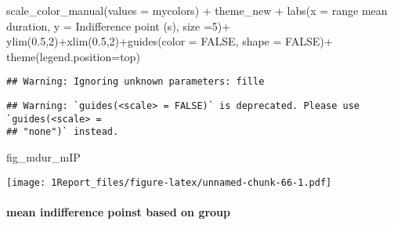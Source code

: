 \documentclass[
]{article}
\newenvironment{Shaded}{\begin{snugshade}}{\end{snugshade}}
\newcommand{\AttributeTok}[1]{\textcolor[rgb]{0.77,0.63,0.00}{#1}}
\newcommand{\ConstantTok}[1]{\textcolor[rgb]{0.00,0.00,0.00}{#1}}
\newcommand{\DecValTok}[1]{\textcolor[rgb]{0.00,0.00,0.81}{#1}}
\newcommand{\FloatTok}[1]{\textcolor[rgb]{0.00,0.00,0.81}{#1}}
\newcommand{\FunctionTok}[1]{\textcolor[rgb]{0.00,0.00,0.00}{#1}}
\newcommand{\NormalTok}[1]{#1}
\newcommand{\SpecialCharTok}[1]{\textcolor[rgb]{0.00,0.00,0.00}{#1}}
\newcommand{\StringTok}[1]{\textcolor[rgb]{0.31,0.60,0.02}{#1}}
\begin{document}
\begin{Shaded}
\begin{Highlighting}[]
  \FunctionTok{scale\_color\_manual}\NormalTok{(}\AttributeTok{values =}\NormalTok{ mycolors) }\SpecialCharTok{+}
\NormalTok{  theme\_new }\SpecialCharTok{+}
  \FunctionTok{labs}\NormalTok{(}\AttributeTok{x =} \StringTok{\textquotesingle{}range mean duration\textquotesingle{}}\NormalTok{, }\AttributeTok{y =} \StringTok{\textquotesingle{}Indifference point (s)\textquotesingle{}}\NormalTok{, }\AttributeTok{size =}\DecValTok{5}\NormalTok{)}\SpecialCharTok{+}
  \FunctionTok{ylim}\NormalTok{(}\FloatTok{0.5}\NormalTok{,}\DecValTok{2}\NormalTok{)}\SpecialCharTok{+}\FunctionTok{xlim}\NormalTok{(}\FloatTok{0.5}\NormalTok{,}\DecValTok{2}\NormalTok{)}\SpecialCharTok{+}\FunctionTok{guides}\NormalTok{(}\AttributeTok{color =} \ConstantTok{FALSE}\NormalTok{, }\AttributeTok{shape =} \ConstantTok{FALSE}\NormalTok{)}\SpecialCharTok{+}
   \FunctionTok{theme}\NormalTok{(}\AttributeTok{legend.position=}\StringTok{\textquotesingle{}top\textquotesingle{}}\NormalTok{)}
\end{Highlighting}
\end{Shaded}

\begin{verbatim}
## Warning: Ignoring unknown parameters: fille
\end{verbatim}

\begin{verbatim}
## Warning: `guides(<scale> = FALSE)` is deprecated. Please use `guides(<scale> =
## "none")` instead.
\end{verbatim}

\begin{Shaded}
\begin{Highlighting}[]
\NormalTok{fig\_mdur\_mIP}
\end{Highlighting}
\end{Shaded}

\texttt{[image: 1Report\_files/figure-latex/unnamed-chunk-66-1.pdf]}

\hypertarget{mean-indifference-poinst-based-on-group}{%
\paragraph{mean indifference poinst based on
group}\label{mean-indifference-poinst-based-on-group}}
\end{document}

